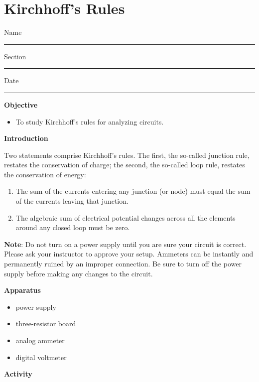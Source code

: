 
\section{Kirchhoff's Rules}

Name \rule{2.0in}{0.1pt}\hfill{}Section \rule{1.0in}{0.1pt}\hfill{}Date
\rule{1.0in}{0.1pt}

\textbf{Objective}

\begin{itemize}
\item To study Kirchhoff's rules for analyzing circuits.
\end{itemize}
\textbf{Introduction}

Two statements comprise Kirchhoff's rules. The first, the so-called
junction rule, restates the conservation of charge; the second, the
so-called loop rule, restates the conservation of energy:

\begin{enumerate}
\item The sum of the currents entering any junction (or node) must equal
the sum of the currents leaving that junction.
\item The algebraic sum of electrical potential changes across all the elements
around any closed loop must be zero.
\end{enumerate}
\textbf{Note}: Do not turn on a power supply until you are sure your
circuit is correct. Please ask your instructor to approve your setup.
Ammeters can be instantly and permanently ruined by an improper connection.
Be sure to turn off the power supply before making any changes to
the circuit.

\textbf{Apparatus}

\begin{itemize}
\item power supply
\item three-resistor board
\item analog ammeter
\item digital voltmeter
\end{itemize}
\textbf{Activity}

\vspace{0.3cm}
{\centering {} \par}
\vspace{0.3cm}


